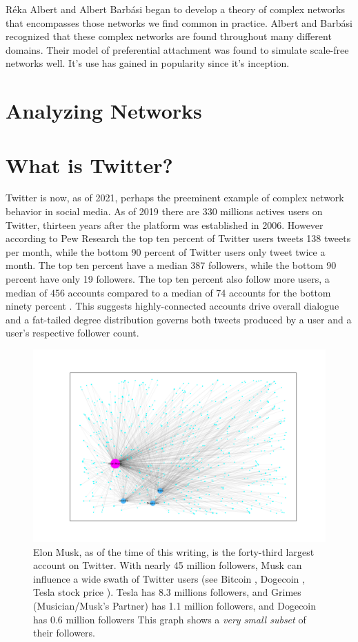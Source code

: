 Réka Albert and Albert Barbási began to develop a theory of complex networks that 
encompasses those networks we find common in practice. Albert and Barbási 
recognized that these complex networks are found throughout many different domains. Their
model of preferential attachment was found to simulate scale-free networks well. It's use
has gained in popularity since it's inception.

\section{Analyzing Networks}


\section{What is Twitter?}
Twitter is now, as of 2021, perhaps the preeminent example of complex network behavior in social media.
As of 2019 there are 330 millions actives users on Twitter, thirteen years after the platform was
established in 2006. However according to Pew Research the top ten percent of Twitter users tweets 138 
tweets per month, while the bottom 90 percent of Twitter users only tweet twice a month. The top ten percent
have a median 387 followers, while the bottom 90 percent have only 19 followers. The top ten percent
also follow more users, a median of 456 accounts compared to a median of 74 accounts for the bottom ninety percent \cite{wojcik2019sizing}.
This suggests highly-connected accounts drive overall dialogue and a fat-tailed
degree distribution governs both tweets produced by a user and a user's respective follower count.


\begin{figure}
    \includegraphics[width=15cm]{Images/elon_graph.png}
    \centering
    \caption{Elon Musk, as of the time of this writing, is the forty-third largest account on Twitter. With nearly 45 million
    followers, Musk can influence a wide swath of Twitter users (see Bitcoin \cite{elontweet2}, Dogecoin \cite{dogecoin}, Tesla stock price \cite{elontweet}).
    Tesla has 8.3 millions followers,
     and Grimes (Musician/Musk's Partner) has 1.1 million followers, 
     and Dogecoin has 0.6 million followers
      This graph shows a \textit{very small subset} of their followers.}
\end{figure}


